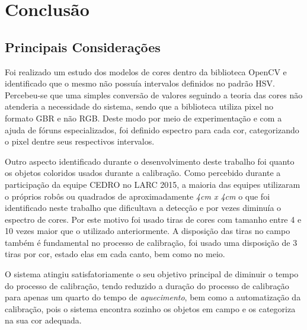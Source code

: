 
\chapter{Conclusão} \label{Cap:Conclusao}

\section{Principais Considerações}
	Foi realizado um estudo dos modelos de cores dentro da biblioteca OpenCV e identificado que o mesmo não possuía intervalos definidos no padrão HSV. Percebeu-se que uma simples conversão de valores seguindo a teoria das cores não atenderia a necessidade do sistema, sendo que a biblioteca utiliza pixel no formato GBR e não RGB. Deste modo por meio de experimentação e com a ajuda de fóruns especializados, foi definido espectro para cada cor, categorizando o pixel dentre seus respectivos intervalos.
	
	Outro aspecto identificado durante o desenvolvimento deste trabalho foi quanto os objetos coloridos usados durante a calibração. Como percebido durante a participação da equipe CEDRO no LARC 2015, a maioria das equipes utilizaram o próprios robôs ou quadrados de aproximadamente \textit{4cm x 4cm} o que foi identificado neste trabalho que dificultava a detecção e por vezes diminuía o espectro de cores. Por este motivo foi usado tiras de cores com tamanho entre 4 e 10 vezes maior que o utilizado anteriormente. A disposição das tiras no campo também é fundamental no processo de calibração, foi usado uma disposição de 3 tiras por cor, estado elas em cada canto, bem como no meio. 
	
	O sistema atingiu satisfatoriamente o seu objetivo principal de diminuir o tempo do processo de calibração, tendo reduzido a duração do processo de calibração para apenas um quarto do tempo de \emph{aquecimento}, bem como a automatização da calibração, pois o sistema encontra sozinho os objetos em campo e os categoriza na sua cor adequada. 

